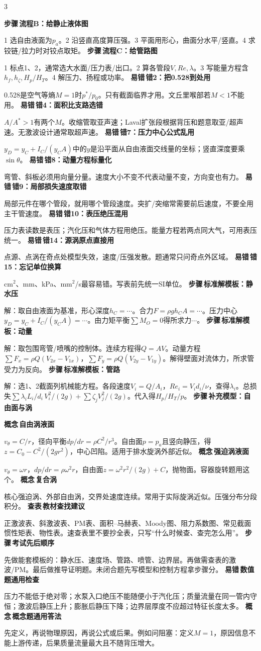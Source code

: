 \documentclass[a4paper]{article}
\newcommand{\labtag}[3]{{\bfseries\color{#1}\colorbox{#1}{\color{white}\fontsize{2.35}{2.48}\selectfont #2}\,#3}\par}
\newcommand{\step}[1]{\labtag{S}{步骤}{#1}}
\newcommand{\err}[1]{\labtag{R}{易错}{#1}}
\newcommand{\lookup}[1]{\labtag{C}{查表}{#1}}
\newcommand{\concept}[1]{\labtag{V}{概念}{#1}}
\newcommand{\stepq}[1]{\step{#1}}
\newcommand{\errq}[1]{\err{#1}}
\newcommand{\lookq}[1]{\lookup{#1}}
\newcommand{\conceptq}[1]{\concept{#1}}
\newenvironment{vfourWrap}{\par\begingroup\fontsize{2.68}{2.84}\selectfont\setlength{\fboxsep}{0.45pt}}{\par\endgroup}
\begin{document}
\begin{multicols}{3}
\begin{vfourWrap}
\stepq{流程B：给静止液体图}
1 选自由液面为$p_a$。2 沿竖直高度算压强。3 平面用形心，曲面分水平/竖直。4 求铰链/拉力时对铰点取矩。
\stepq{流程C：给管路图}
1 标点1、2，通常选大水面/压力表/出口。2 算各管段$V,Re,\lambda$。3 写能量方程含$h_f,h_\zeta,H_p/H_T$。4 解压力、扬程或功率。
\errq{错2：把0.528到处用}
0.528是空气等熵$M=1$时$p^*/p_0$。只有截面临界才用。文丘里喉部若$M<1$不能用。
\errq{错4：面积比支路选错}
$A/A^*>1$有两个$M$。收缩管取亚声速；Laval扩张段根据背压和题意取亚/超声速。无激波设计通常取超声速。
\errq{错7：压力中心公式乱用}
$y_D=y_C+I_C/(y_CA)$中的$y$是沿平面从自由液面交线量的坐标；竖直深度要乘$\sin\theta$。
\errq{错8：动量方程标量化}
弯管、斜板必须用向量分量。速度大小不变不代表动量不变，方向变也有力。
\errq{错9：局部损失速度取错}
局部元件在哪个管段，就用哪个管段速度。突扩/突缩常需要前后速度，不要全用主干管速度。
\errq{错10：表压绝压混用}
压力表读数是表压；汽化压和气体方程用绝压。能量方程若两点同大气，可用表压统一。
\errq{错14：源涡原点直接用}
点源、点涡在奇点处模型失效，速度/压强发散。题通常只问奇点外区域。
\errq{错15：忘记单位换算}
cm$^2$、mm、kPa、mm$^2$/s最容易错。写表前先统一SI单位。
\stepq{标准解模板：静水压}
解：取自由液面为基准，形心深度$h_C=\cdots$。合力$F=\rho gh_CA=\cdots$。压力中心$y_D=y_C+I_C/(y_CA)=\cdots$。由力矩平衡$\sum M_O=0$得所求力$\cdots$。
\stepq{标准解模板：动量}
解：取包围弯管/喷嘴的控制体。连续方程得$Q=AV$。动量方程$\sum F_x=\rho Q(V_{2x}-V_{1x})$，$\sum F_y=\rho Q(V_{2y}-V_{1y})$。解得壁面对流体力，所求管受力为反向。
\stepq{标准解模板：管路}
解：选1、2截面列机械能方程。各段速度$V_i=Q/A_i$，$Re_i=V_id_i/\nu$，查得$\lambda_i$。总损失$\sum\lambda_iL_i/d_i\,V_i^2/(2g)+\sum\zeta_jV_j^2/(2g)$。代入得$H_p/H_T/p$。
\stepq{补充模型：自由面与涡}
\conceptq{自由涡液面}
$v_\theta=C/r$，径向平衡$dp/dr=\rho C^2/r^3$。自由面$p=p_a$且竖向静压，得$z=C_0-C^2/(2gr^2)$，中心凹陷。适用于排水旋涡外部近似。
\conceptq{强迫涡液面}
$v_\theta=\omega r$，$dp/dr=\rho\omega^2r$，自由面$z=\omega^2r^2/(2g)+C$，抛物面。容器旋转题用这个。
\conceptq{复合涡}
核心强迫涡、外部自由涡，交界处速度连续。常用于实际旋涡近似。压强分布分段积分。
\lookq{教材查找建议}
正激波表、斜激波表、PM表、面积--马赫表、Moody图、阻力系数图、常见截面惯性矩表、物性表。速查表里不要抄全表，只写“什么时候查、查完怎么用”。
\stepq{考试先后顺序}
先做能套模板的：静水压、速度场、管路、喷管、边界层。再做需查表的激波/PM。最后做推导证明题。未闭合题先写模型和控制方程拿步骤分。
\errq{数值题通用检查}
压力不能低于绝对零；水泵入口绝压不能随便小于汽化压；质量流量在同一管内守恒；激波后静压上升；膨胀后静压下降；边界层厚度不应超过特征长度太多。
\conceptq{概念题通用答法}
先定义，再说物理原因，再说公式或后果。例如问阻塞：定义$M=1$，原因信息不能上游传递，后果质量流量最大且不随背压增大。

\end{vfourWrap}
\end{multicols}
\end{document}
